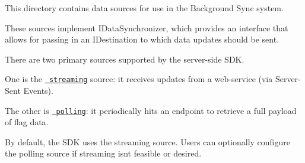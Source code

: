 This directory contains data sources for use in the Background Sync system.

These sources implement {\ttfamily IData\+Synchronizer}, which provides an interface that allows for passing in an {\ttfamily IDestination} to which data updates should be sent.

There are two primary sources supported by the server-\/side SDK.

One is the \href{./streaming}{\texttt{ streaming}} source\+: it receives updates from a web-\/service (via Server-\/\+Sent Events).

The other is \href{./polling}{\texttt{ polling}}\+: it periodically hits an endpoint to retrieve a full payload of flag data.

By default, the SDK uses the streaming source. Users can optionally configure the polling source if streaming isn\textquotesingle{}t feasible or desired. 